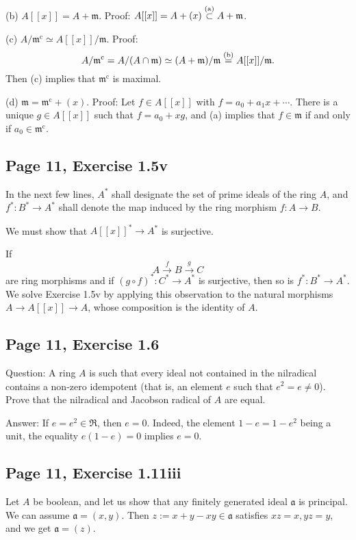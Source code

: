 \documentclass[parskip=half,fontsize=12pt]{scrartcl}%
\newcommand{\oo}{\operatorname}\newcommand{\ooo}{\operatorname*}
\newcommand{\mf}{\mathfrak}
\newcommand{\aaa}{\mf a}
\newcommand{\mmm}{\mf m}
\begin{document}
(b) $A[[x]]=A+\mmm$. Proof: $A[[x]]=A+(x)\overset{(\text a)}\subset A+\mmm$.

(c) $A/\mmm^{\oo c}\simeq A[[x]]/\mmm$. Proof: 
$$
A/\mmm^{\oo c}=A/(A\cap\mmm)\simeq(A+\mmm)/\mmm\overset{(\text b)}=A[[x]]/\mmm.
$$ 
Then (c) implies that $\mmm^{\oo c}$ is maximal.

(d) $\mmm=\mmm^{\oo c}+(x)$. Proof: Let $f\in A[[x]]$ with $f=a_0+a_1x+\cdots$. There is a unique $g\in A[[x]]$ such that $f=a_0+xg$, and (a) implies that $f\in\mmm$ if and only if $a_0\in\mmm^{\oo c}$. %

\subsection{Page 11, Exercise 1.5v}%

In the next few lines, $A^*$ shall designate the set of prime ideals of the ring $A$, and $f^*:B^*\to A^*$ shall denote the map induced by the ring morphism $f:A\to B$. 

We must show that $A[[x]]^*\to A^*$ is surjective.

If 
$$
A\xrightarrow fB\xrightarrow gC
$$ 
are ring morphisms and if $(g\circ f)^*:C^*\to A^*$ is surjective, then so is $f^*:B^*\to A^*$. We solve Exercise 1.5v by applying this observation to the natural morphisms $A\to A[[x]]\to A$, whose composition is the identity of $A$. 

\subsection{Page 11, Exercise 1.6}%

Question: A ring $A$ is such that every ideal not contained in the nilradical contains a non-zero idempotent (that is, an element $e$ such that $e^2=e\ne0$). Prove that the nilradical and Jacobson radical of $A$ are equal.

Answer: If $e=e^2\in\mf R$, then $e=0$. Indeed, the element $1-e=1-e^2$ being a unit, the equality $e(1-e)=0$ implies $e=0$.

\subsection{Page 11, Exercise 1.11iii}%

Let $A$ be boolean, and let us show that any finitely generated ideal $\aaa$ is principal. We can assume $\aaa=(x,y)$. Then $z:=x+y-xy\in\aaa$ satisfies $xz=x,yz=y$, and we get $\aaa=(z)$.
\end{document}
